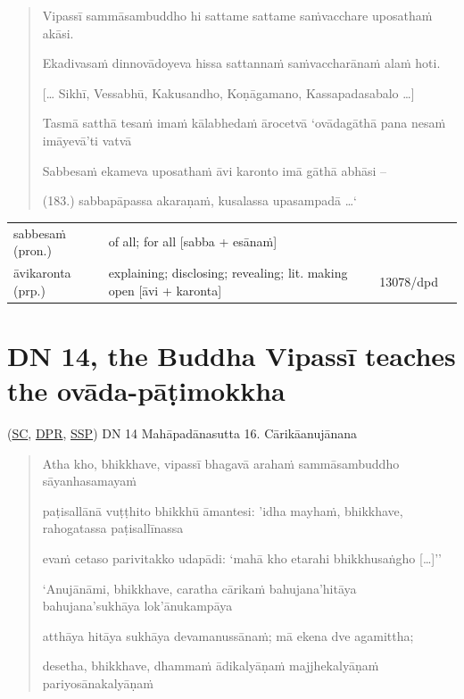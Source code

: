 \documentclass[11pt,oneside]{memoir}
\begin{document}
\begin{quote}
Vipassī sammāsambuddho hi sattame sattame saṁvacchare uposathaṁ akāsi.

Ekadivasaṁ dinnovādoyeva hissa sattannaṁ saṁvaccharānaṁ alaṁ hoti.

[\ldots{} Sikhī, Vessabhū, Kakusandho, Koṇāgamano, Kassapadasabalo \ldots{}]

Tasmā satthā tesaṁ imaṁ kālabhedaṁ ārocetvā `ovādagāthā pana nesaṁ imāyevā'ti vatvā

Sabbesaṁ ekameva uposathaṁ āvi karonto imā gāthā abhāsi –

(183.) sabbapāpassa akaraṇaṁ, kusalassa upasampadā \ldots{}`
\end{quote}

\begin{longtable}{L{\colOne} L{\colTwo} H H}
sabbesaṁ (pron.) & of all; for all [sabba + esānaṁ] &  & \\[0pt]
āvikaronta (prp.) & explaining; disclosing; revealing; lit. making open [āvi + karonta] & 13078/dpd & \\[0pt]
\end{longtable}

\section{DN 14, the Buddha Vipassī teaches the ovāda-pāṭimokkha}
\label{sec:org3e107cd}
(\href{https://suttacentral.net/dn14/pli/ms}{SC}, \href{https://www.digitalpalireader.online/\_dprhtml/index.html?loc=d.1.0.0.0.0.15.m\&para=3}{DPR}, \href{http://localhost:4848/suttas/dn14/pli/ms?quote=pa\%25E1\%25B9\%25ADisall\%25C4\%2581n\%25C4\%2581\%2520vu\%25E1\%25B9\%25AD\%25E1\%25B9\%25ADhito\%2520bhikkh\%25C5\%25AB\%2520\%25C4\%2581mantesi\&window\_type=Sutta+Study}{SSP}) DN 14 Mahāpadānasutta 16. Cārikāanujānana

\vspace*{-0.5\baselineskip}
\enlargethispage*{1.5\baselineskip}

\begin{quote}
Atha kho, bhikkhave, vipassī bhagavā arahaṁ sammāsambuddho sāyanhasamayaṁ

paṭisallānā vuṭṭhito bhikkhū āmantesi: 'idha mayhaṁ, bhikkhave, rahogatassa paṭisallīnassa

evaṁ cetaso parivitakko udapādi: `mahā kho etarahi bhikkhusaṅgho [\ldots{}]''

‘Anujānāmi, bhikkhave, caratha cārikaṁ bahujana'hitāya bahujana'sukhāya lok'ānukampāya

atthāya hitāya sukhāya devamanussānaṁ; mā ekena dve agamittha;

desetha, bhikkhave, dhammaṁ ādikalyāṇaṁ majjhekalyāṇaṁ pariyosānakalyāṇaṁ
\end{quote}
\end{document}

